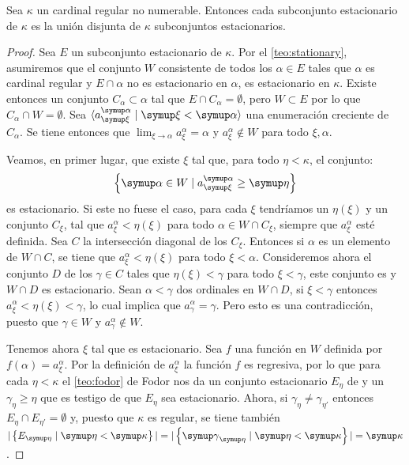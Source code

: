 \begin{teo}[Solovay]\label{teo:solovay}
    Sea $\kappa$ un cardinal regular no numerable. Entonces cada subconjunto estacionario
    de $\kappa$ es la unión disjunta de $\kappa$ subconjuntos estacionarios.
\end{teo}

\newcommand{\seqa}{a_\xi^\alpha}
\begin{proof}
    Sea $E$ un subconjunto estacionario de $\kappa$.
    Por el \cref{teo:stationary}, asumiremos que el conjunto $W$
    consistente de todos los $\alpha\in E$ tales que $\alpha$ es cardinal
    regular y $E\cap\alpha$ no es estacionario en $\alpha$, es estacionario en $\kappa$.
    Existe entonces un conjunto \cna{} $C_\alpha\subset\alpha$ tal que $E\cap C_\alpha = \emptyset$,
    pero $W\subset E$ por lo que $C_\alpha\cap W=\emptyset$.
    Sea $\seq{\seqa\mid\xi<\alpha}$ una enumeración creciente de $C_\alpha$.
    Se tiene entonces que $\lim_{\xi\to\alpha}\seqa = \alpha$ y $\seqa\notin W$ para todo $\xi, \alpha$.

    Veamos, en primer lugar, que existe $\xi$ tal que, para todo $\eta<\kappa$, el conjunto:
    \begin{equation}\label{eqn:solovay-stationary}
        \set{\alpha\in W\mid \seqa\geq\eta}
    \end{equation}
    es estacionario. Si este no fuese el caso, para cada $\xi$ tendríamos un $\eta(\xi)$
    y un conjunto \cna{} $C_\xi$, tal que $\seqa < \eta(\xi)$ para todo $\alpha\in W\cap C_\xi$, siempre que $\seqa$
    esté definida. Sea $C$ la intersección diagonal de los $C_\xi$. Entonces si $\alpha$ es un elemento de
    $W\cap C$, se tiene que $\seqa < \eta(\xi)$ para todo $\xi<\alpha$. Consideremos ahora el conjunto $D$ de
    los $\gamma\in C$ tales que $\eta(\xi)<\gamma$ para todo $\xi<\gamma$, este conjunto es \cna{}
    y $W\cap D$ es estacionario. Sean $\alpha<\gamma$ dos ordinales en $W\cap D$,
    si $\xi<\gamma$ entonces $\seqa<\eta(\xi)<\gamma$, lo cual implica que $a_\gamma^\alpha = \gamma$.
    Pero esto es una contradicción, puesto que $\gamma\in W$ y $a_\gamma^\alpha\notin W$.

    Tenemos ahora $\xi$ tal que  es estacionario.
    Sea $f$ una función en $W$ definida por $f(\alpha)=\seqa$. Por la definición de $\seqa$
    la función $f$ es regresiva, por lo que para cada $\eta<\kappa$ el \cref{teo:fodor} de Fodor
    nos da un conjunto estacionario $E_\eta$ de  y un $\gamma_\eta\geq\eta$
    que es testigo de que $E_\eta$ sea estacionario.
    Ahora, si $\gamma_\eta\neq\gamma_{\eta'}$ entonces $E_\eta\cap E_{\eta'} = \emptyset$ y, puesto que $\kappa$ es regular,
    se tiene también $|\set{E_\eta\mid\eta<\kappa}| = |\set{\gamma_\eta\mid\eta<\kappa}| = \kappa$.
\end{proof}

